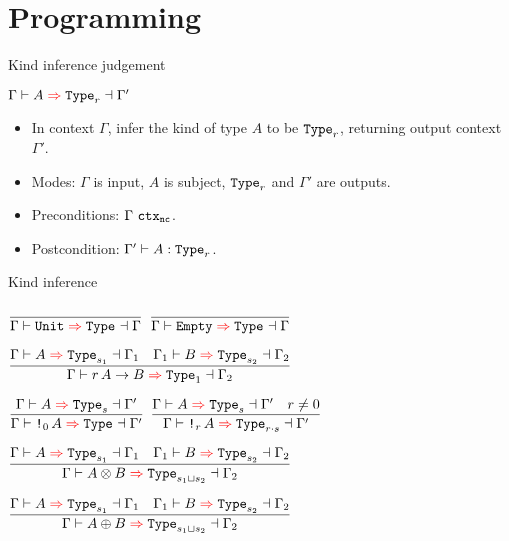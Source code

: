 \section{Programming}\begin{frame}{Kind inference judgement}

$\inferkind{\Gamma}{A}[r]{\Gamma'}$
\begin{itemize}
  \item In context $\Gamma$, infer the kind of type $A$ to be $\Type[r]$, returning output context $\Gamma'$.
  \item Modes: $\Gamma$ is input, $A$ is subject, $\Type[r]$ and $\Gamma'$ are outputs.
  \item Preconditions: $\ctx[\noncomputable]{\Gamma}$.
  \item Postcondition: $\type[\Gamma']{A}[r]$.
\end{itemize}

\end{frame}

\begin{frame}{Kind inference}

\begin{center}
  $\infrule{}{\inferkind{\Gamma}{\Unit}{\Gamma}}$ \quad
  $\infrule{}{\inferkind{\Gamma}{\Empty}{\Gamma}}$

  \vspace{2em}

  $\infrule{\inferkind{\Gamma}{A}[s_1]{\Gamma_1} \quad \inferkind{\Gamma_1}{B}[s_2]{\Gamma_2}}{\inferkind{\Gamma}{\Fun[r]{A}{B}}[\One]{\Gamma_2}}$

  \vspace{2em}

  $\infrule{\inferkind{\Gamma}{A}[s]{\Gamma'}}{\inferkind{\Gamma}{\Box[\Zero]{A}}{\Gamma'}}$ \quad
  $\infrule{\inferkind{\Gamma}{A}[s]{\Gamma'} \quad r \neq \Zero}{\inferkind{\Gamma}{\Box[r]{A}}[\mulqty{r}{s}]{\Gamma'}}$

  \vspace{2em}

  $\infrule{\inferkind{\Gamma}{A}[s_1]{\Gamma_1} \quad \inferkind{\Gamma_1}{B}[s_2]{\Gamma_2}}{\inferkind{\Gamma}{\Prod{A}{B}}[\lubqty{s_1}{s_2}]{\Gamma_2}}$

  \vspace{1em}

  $\infrule{\inferkind{\Gamma}{A}[s_1]{\Gamma_1} \quad \inferkind{\Gamma_1}{B}[s_2]{\Gamma_2}}{\inferkind{\Gamma}{\Sum{A}{B}}[\lubqty{s_1}{s_2}]{\Gamma_2}}$
\end{center}

\end{frame}

